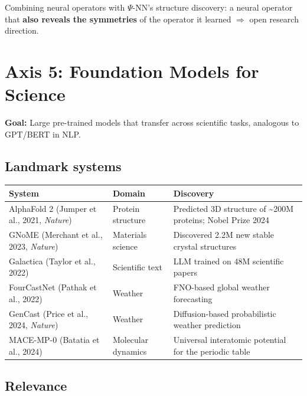 \documentclass[11pt,a4paper]{article}
\begin{document}
Combining neural operators with $\Psi$-NN's structure discovery: a neural operator that \textbf{also reveals the symmetries} of the operator it learned $\Rightarrow$ open research direction.

\section{Axis 5: Foundation Models for Science}

\textbf{Goal:} Large pre-trained models that transfer across scientific tasks, analogous to GPT/BERT in NLP.

\subsection{Landmark systems}

\begin{center}
\renewcommand{\arraystretch}{1.3}
\begin{tabular}{@{}p{3.5cm} p{3cm} p{6cm}@{}}
\toprule
\textbf{System} & \textbf{Domain} & \textbf{Discovery} \\
\midrule
AlphaFold 2 (Jumper et al., 2021, \textit{Nature}) & Protein structure & Predicted 3D structure of \textasciitilde200M proteins; Nobel Prize 2024 \\
\addlinespace
GNoME (Merchant et al., 2023, \textit{Nature}) & Materials science & Discovered 2.2M new stable crystal structures \\
\addlinespace
Galactica (Taylor et al., 2022) & Scientific text & LLM trained on 48M scientific papers \\
\addlinespace
FourCastNet (Pathak et al., 2022) & Weather & FNO-based global weather forecasting \\
\addlinespace
GenCast (Price et al., 2024, \textit{Nature}) & Weather & Diffusion-based probabilistic weather prediction \\
\addlinespace
MACE-MP-0 (Batatia et al., 2024) & Molecular dynamics & Universal interatomic potential for the periodic table \\
\bottomrule
\end{tabular}
\end{center}

\subsection{Relevance}
\end{document}
